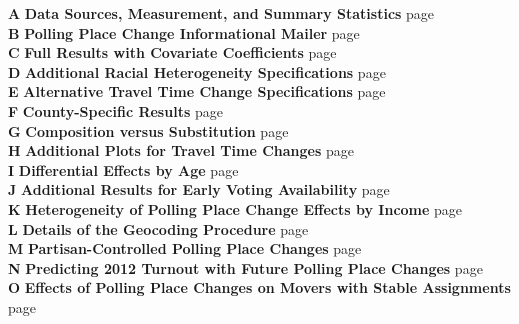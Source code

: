 \documentclass{cup_PSRM}
\begin{document}
\noindent \textbf{A} 	\hspace*{.2in} \textbf{Data Sources, Measurement, and Summary Statistics  } \dotfill page~\pageref{appendix_datasources}\\
\textbf{B} 		\hspace*{.205in} \textbf{Polling Place Change Informational Mailer } 		\dotfill page~\pageref{appendix_mailer} \\
\textbf{C} 		\hspace*{.2in}   \textbf{Full Results with Covariate Coefficients } 			\dotfill page~\pageref{appendix_fullresults} \\
\textbf{D} 		\hspace*{.193in} \textbf{Additional Racial Heterogeneity Specifications } 	\dotfill page~\pageref{appendix_racehetero} \\
\textbf{E} 		\hspace*{.202in} \textbf{Alternative Travel Time Change Specifications } 	\dotfill page~\pageref{appendix_traveltime} \\
\textbf{F} 		\hspace*{.22in}  \textbf{County-Specific Results } 		\dotfill page~\pageref{appendix_county} \\
\textbf{G} 		\hspace*{.193in} \textbf{Composition versus Substitution} 	\dotfill page~\pageref{appendix_substitution_v_composition} \\
\textbf{H} 		\hspace*{.190in} \textbf{Additional Plots for Travel Time Changes } \dotfill page~\pageref{appendix_distributionppchanges} \\
\textbf{I} 		\hspace*{.251in} \textbf{Differential Effects by Age } 	\dotfill page~\pageref{appendix_age} \\
\textbf{J} 		\hspace*{.233in} \textbf{Additional Results for Early Voting Availability } 	\dotfill page~\pageref{appendix_early} \\
\textbf{K} 		\hspace*{.199in} \textbf{Heterogeneity of Polling Place Change Effects by Income } 	\dotfill page~\pageref{appendix_incomehetero} \\
\textbf{L} 		\hspace*{.223in} \textbf{Details of the Geocoding Procedure} 	\dotfill page~\pageref{appendix_geocoding}\\
\textbf{M} 		\hspace*{.201in} \textbf{Partisan-Controlled Polling Place Changes} \dotfill page~\pageref{appendix_partisan}\\
\textbf{N} 		\hspace*{.223in} \textbf{Predicting 2012 Turnout with Future Polling Place Changes} \dotfill page~\pageref{appendix_lead}\\
\textbf{O} 		\hspace*{.219in} \textbf{Effects of Polling Place Changes on Movers with Stable Assignments} \dotfill page~\pageref{appendix_movers_w_same_assignments}\\
\end{document}
